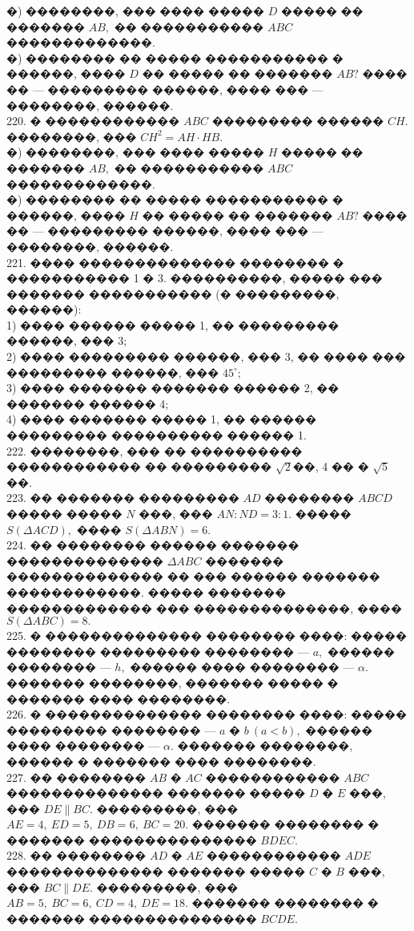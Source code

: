 \documentclass[12pt]{article}
\begin{document}
�) ��������, ��� ���� ����� $D$ ����� �� ������� $AB,$ �� ����������� $ABC$ �������������.\\
�) �������� �� ����� ����������� � ������, ���� $D$ �� ����� �� ������� $AB?$ ���� �� --- ��������� ������, ���� ��� --- ��������, ������.\\
220. � ������������ $ABC$ ��������� ������ $CH.$ ��������, ��� $CH^2=AH\cdot HB.$\\
�) ��������, ��� ���� ����� $H$ ����� �� ������� $AB,$ �� ����������� $ABC$ �������������.\\
�) �������� �� ����� ����������� � ������, ���� $H$ �� ����� �� ������� $AB?$ ���� �� --- ��������� ������, ���� ��� --- ��������, ������.\\
221. ���� �������������� �������� � ����������� 1 � 3. ����������, ����� ��� ������� ����������� (� ���������, ������):\\
1) ���� ������ ����� 1, �� ��������� ������, ��� 3;\\
2) ���� ��������� ������, ��� 3, �� ���� ��� ��������� ������, ��� $45^\circ;$\\
3) ���� ������� ������� ������ 2, �� ������� ������ 4;\\
4) ���� ������� ����� 1, �� ������ ��������� ���������� ������ 1.\\
222. ��������, ��� �� ���������� ������������ �� ��������� $\sqrt{2}$��, 4 �� � $\sqrt{5}$ ��.\\
223. �� ������� ��������� $AD$ �������� $ABCD$ ����� ����� $N$ ���, ��� $AN:ND=3:1.$ ����� $S(\Delta ACD),$ ���� $S(\Delta ABN)=6.$\\
224. �� �������� ������ ������� �������������� $\Delta ABC$ ������� �������������� �� ��� ������ ������� ������������. ����� ������� ������������� ��� ��������������, ���� $S(\Delta ABC)=8.$\\
225. � �������������� �������� ����: ����� �������� ��������� �������� --- $a,$ ������ �������� --- $h,$ ������ ���� �������� --- $\alpha.$ ������� ��������, ������� ����� � ������� ���� ��������.\\
226. � �������������� �������� ����: ����� ��������� �������� --- $a$ � $b\ (a<b),$ ������ ���� �������� --- $\alpha.$ ������� ��������, ������ � ������� ���� ��������.\\
227. �� �������� $AB$ � $AC$ ������������ $ABC$ �������������� ������� ����� $D$ � $E$ ���, ��� $DE\parallel BC.$ ���������, ��� $AE=4,\ ED=5,\ DB=6,\ BC=20.$ ������� �������� � ������� ��������������� $BDEC.$\\
228. �� �������� $AD$ � $AE$ ������������ $ADE$ �������������� ������� ����� $C$ � $B$ ���, ��� $BC\parallel DE.$ ���������, ��� $AB=5,\ BC=6,\ CD=4,\ DE=18.$ ������� �������� � ������� ��������������� $BCDE.$\\
\end{document}
